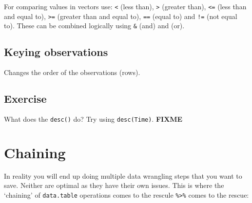 \documentclass[letterpaperpaper,9pt,twocolumn,twoside,printwatermark=false]{pinp}
\begin{document}
For comparing values in vectors use: \texttt{\textless{}} (less than),
\texttt{\textgreater{}} (greater than), \texttt{\textless{}=} (less than
and equal to), \texttt{\textgreater{}=} (greater than and equal to),
\texttt{==} (equal to) and \texttt{!=} (not equal to). These can be
combined logically using \texttt{\&} (and) and \texttt{\textbar{}} (or).

\hypertarget{keying-observations}{%
\subsection{Keying observations}\label{keying-observations}}

Changes the order of the observations (rows).

\begin{Shaded}
\begin{Highlighting}[]
\CommentTok{#   ---                                  }
\CommentTok{#   ---                                  }
\end{Highlighting}
\end{Shaded}

\hypertarget{exercise-9}{%
\subsection{Exercise}\label{exercise-9}}

What does the \texttt{desc()} do? Try using \texttt{desc(Time)}.
\textbf{FIXME}

\hypertarget{chaining}{%
\section{Chaining}\label{chaining}}

In reality you will end up doing multiple data wrangling steps that you
want to save. Neither are optimal as they have their own issues. This is
where the `chaining' of \texttt{data.table} operations comes to the
rescule \texttt{\%\textgreater{}\%} comes to the rescue:
\end{document}
